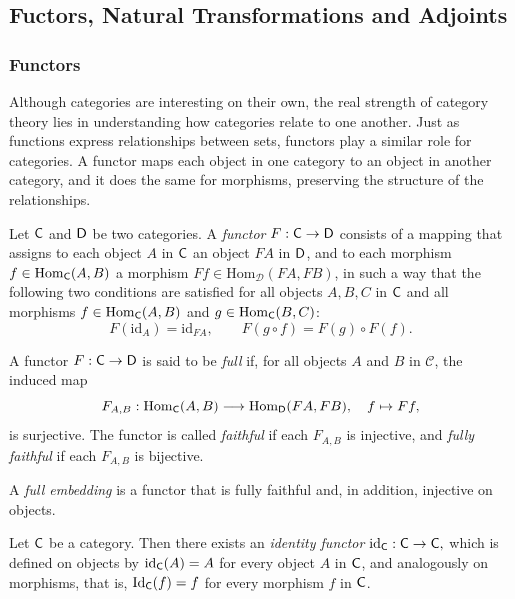 \subsection{Fuctors, Natural Transformations and Adjoints}

\subsubsection{Functors}
  

Although categories are interesting on their own, the real strength of category theory lies in understanding how categories relate to one another. Just as functions express relationships between sets, functors play a similar role for categories. A functor maps each object in one category to an object in another category, and it does the same for morphisms, preserving the structure of the relationships.

\begin{definition}
  Let $\mathsf{C}$ and $\mathsf{D}$ be two categories. A \emph{functor} $F: \mathsf{C} \to \mathsf{D}$ consists of a mapping that assigns to each object $A$ in $\mathsf{C}$ an object $FA$ in $\mathsf{D}$, and to each morphism $f \in \mathrm{Hom}_{\mathsf{C}}(A, B)$ a morphism $Ff \in \mathrm{Hom}_{\mathcal{D}}(FA, FB)$, in such a way that the following two conditions are satisfied for all objects $A, B, C$ in $\mathsf{C}$ and all morphisms $f \in \mathrm{Hom}_{\mathsf{C}}(A,B)$ and $g \in \mathrm{Hom}_{\mathsf{C}}(B,C)$:
\[
F(\mathrm{id}_A) = \mathrm{id}_{FA}, \qquad F(g \circ f) = F(g) \circ F(f).
\]

A functor $F: \mathsf{C} \to \mathsf{D}$ is said to be \emph{full} if, for all objects $A$ and $B$ in $\mathcal{C}$, the induced map
\[
F_{A,B}: \mathrm{Hom}_{\mathsf{C}}(A, B) \longrightarrow \mathrm{Hom}_{\mathsf{D}}(FA, FB), \quad f \mapsto Ff,
\]
is surjective. The functor is called \emph{faithful} if each $F_{A,B}$ is injective, and \emph{fully faithful} if each $F_{A,B}$ is bijective.

A \emph{full embedding} is a functor that is fully faithful and, in addition, injective on objects.
\end{definition}

\begin {example}
Let $\mathsf{C}$ be a category. Then there exists an \emph{identity functor} $\mathrm{id}_{\mathsf{C}} : \mathsf{C} \to \mathsf{C},$
which is defined on objects by $\mathrm{id}_{\mathsf{C}}(A) = A$ for every object $A$ in $\mathsf{C}$, and analogously on morphisms, that is, $\mathrm{Id}_{\mathsf{C}}(f) = f$ for every morphism $f$ in $\mathsf{C}$.
\end{example}

